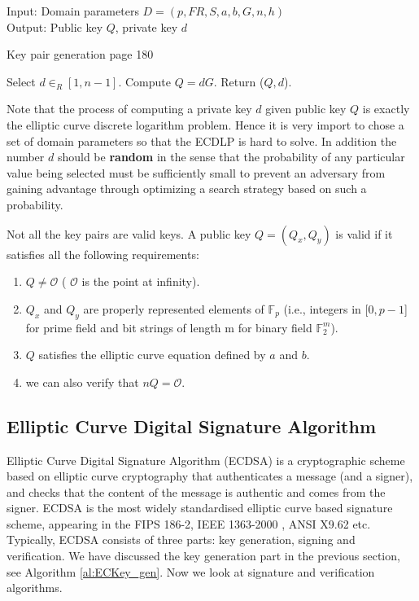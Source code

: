 \begin{algorithm}[H]
Input: Domain parameters $D=(p,FR,S,a,b,G,n,h)$ \\
Output: Public key $Q$, private key $d$ 
\caption{Key pair generation \cite{hankerson2006guide} page 180}
 \label{al:ECKey_gen}
 \begin{algorithmic} [1]
	\STATE Select $d \in _R \left[ 1, n-1 \right] $.
	\STATE Compute $Q = dG$.
	\STATE Return ($Q,d$).
 \end{algorithmic}
\end{algorithm}
Note that the process of computing a private key $d$ given public key $Q$ is exactly the elliptic curve discrete logarithm problem. Hence it is very import to chose a set of domain parameters so that the ECDLP is hard to solve. In addition the number $d$ should be \textbf{random} in the sense that the probability of any particular value being selected must be sufficiently small to prevent an adversary from gaining advantage through optimizing a search strategy based on such a probability. 

Not all the key pairs are valid keys. A public key $Q=(Q_x,Q_y)$ is valid if it satisfies all the following requirements:
\begin{enumerate}
	\item $Q \neq \mathcal{O}$ ( $\mathcal{O}$ is the point at infinity).
	\item $Q_x$ and $Q_y$ are properly represented elements of $\mathbb{F}_p$ (i.e., integers in [$0,p-1$] for prime field and bit strings of length m for binary field $\mathbb{F}_2^m$).
	\item $Q$ satisfies the elliptic curve equation defined by $a$ and $b$.
	\item we can also verify that $nQ=\mathcal{O}$.
\end{enumerate}
\subsection{Elliptic Curve Digital Signature Algorithm} \label{sec:ecdsa}
Elliptic Curve Digital Signature Algorithm (ECDSA) is a cryptographic scheme based on elliptic curve cryptography that authenticates a message (and a signer), and checks that the content of the message is authentic and comes from the signer. ECDSA is the most widely standardised elliptic curve based signature scheme, appearing in the FIPS 186-2\cite{fips2000186}, IEEE 1363-2000 \cite{ieee2000ieee}, ANSI X9.62 \cite{ansi2005x9} etc. Typically, ECDSA consists of three parts: key generation, signing and verification. We have discussed the key generation part in the previous section, see Algorithm \ref{al:ECKey_gen}. Now we look at signature and verification algorithms. 

